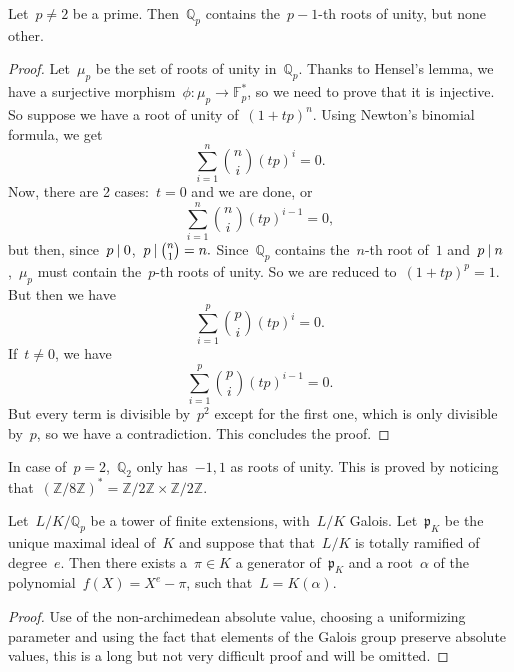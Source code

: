 \begin{lemma}
  Let~$p\neq 2$ be a prime. Then~$\mathbb{Q}_p$ contains the~$p-1$-th roots of unity, but none other.

  \begin{proof}
    Let~$\mu_p$ be the set of roots of unity in~$\mathbb{Q}_p$. Thanks to Hensel's lemma, we have a surjective morphism~$\phi:\mu_p \rightarrow \mathbb{F}_p^*$, so we need to prove that it is injective. So suppose we have a root of unity of~$(1+tp)^n$. Using Newton's binomial formula, we get
    \begin{equation}
      \sum_{i = 1}^n \binom{n}{i} (tp)^{i}=0.  
    \end{equation}
    Now, there are 2 cases:~$t = 0$ and we are done, or
    \begin{equation}
      \sum_{i = 1}^n \binom{n}{i} (tp)^{i-1}=0, 
    \end{equation}
    but then, since~$p\mathbin{|} 0$,~$p\mathbin{|}\binom{n}{1}=n.$ Since~$\mathbb{Q}_p$ contains the~$n$-th root of~$1$ and~$p\mathbin{|} n$,~$\mu_p$ must contain the~$p$-th roots of unity. So we are reduced to~$(1+tp)^p = 1$. But then we have
    \begin{equation}
      \sum_{i = 1}^p \binom{p}{i} (tp)^{i}=0. 
    \end{equation}
    If~$t \neq 0$, we have
    \begin{equation}
      \sum_{i = 1}^p \binom{p}{i} (tp)^{i-1}=0. 
    \end{equation}
    But every term is divisible by~$p^2$ except for the first one, which is only divisible by~$p$, so we have a contradiction. This concludes the proof.
  \end{proof}
\end{lemma}

In case of~$p=2$,~$\mathbb{Q}_2$ only has~$-1,1$ as roots of unity. This is proved by noticing that~$(\mathbb{Z}/8\mathbb{Z})^* = \mathbb{Z}/2\mathbb{Z} \times \mathbb{Z}/2\mathbb{Z}$.

\begin{lemma}
  Let~$L/K/\mathbb{Q}_p$ be a tower of finite extensions, with~$L/K$ Galois. Let~$\mathfrak{p}_K$ be the unique maximal ideal of~$K$ and suppose that that~$L/K$ is totally ramified of degree~$e$. Then there exists a~$\pi \in K$ a generator of~$\mathfrak{p}_K$ and a root~$\alpha$ of the polynomial~$f(X) = X^e - \pi$, such that~$L = K(\alpha)$.

  \begin{proof}
    Use of the non-archimedean absolute value, choosing a uniformizing parameter and using the fact that elements of the Galois group preserve absolute values, this is a long but not very difficult proof and will be omitted.
  \end{proof}
\end{lemma}

